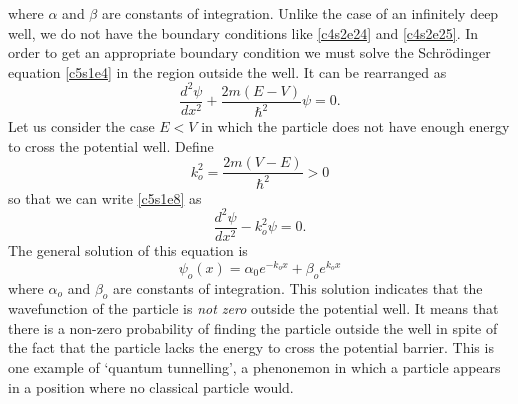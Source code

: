 where $\alpha$ and $\beta$ are constants of integration. Unlike the case of 
an infinitely deep well, we do not have the boundary conditions like 
\eqref{c4s2e24} and \eqref{c4s2e25}. In order to get an appropriate boundary
condition we must solve the Schr\"{o}dinger equation \eqref{c5s1e4} in the 
region outside the well. It can be rearranged as
\begin{equation}\label{c5s1e8}
\frac{d^2\psi}{dx^2} + \frac{2m(E - V)}{\hslash^2}\psi = 0.
\end{equation}
Let us consider the case $E < V$ in which the particle does not have enough
energy to cross the potential well. Define
\begin{equation}\label{c5s1e9}
k_o^2 = \frac{2m(V - E)}{\hslash^2} > 0
\end{equation}
so that we can write \eqref{c5s1e8} as
\begin{equation}\label{c5s1e10}
\frac{d^2\psi}{dx^2} - k_o^2\psi = 0.
\end{equation}
The general solution of this equation is
\begin{equation}\label{c5s1e11}
\psi_o(x) = \alpha_0 e^{-k_ox} + \beta_o e^{k_ox}
\end{equation}
where $\alpha_o$ and $\beta_o$ are constants of integration. This solution
indicates that the wavefunction of the particle is \emph{not zero} outside the
potential well. It means that there is a non-zero probability of finding the
particle outside the well in spite of the fact that the particle lacks the 
energy to cross the potential barrier. This is one example of `quantum
tunnelling', a phenonemon in which a particle appears in a position where no
classical particle would.

